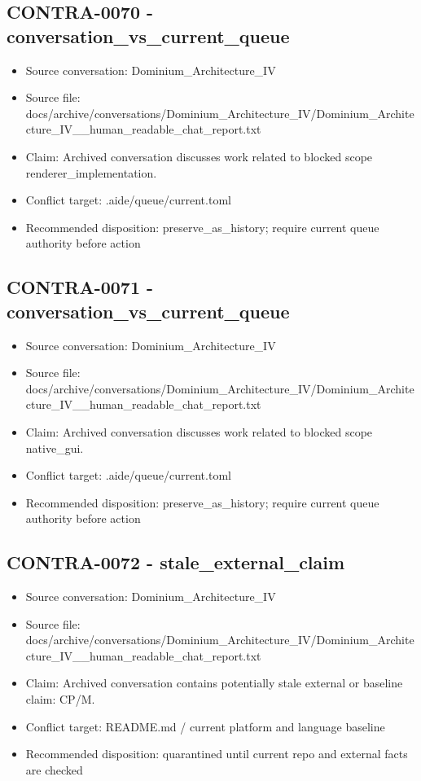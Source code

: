\documentclass[11pt,a4paper]{report}
\begin{document}
\subsection{CONTRA-0070 - conversation\_vs\_current\_queue}

\begin{itemize}
\item Source conversation: Dominium\_Architecture\_IV
\item Source file: docs/archive/conversations/Dominium\_Architecture\_IV/Dominium\_Architecture\_IV\_\_human\_readable\_chat\_report.txt
\item Claim: Archived conversation discusses work related to blocked scope renderer\_implementation.
\item Conflict target: .aide/queue/current.toml
\item Recommended disposition: preserve\_as\_history; require current queue authority before action
\end{itemize}

\subsection{CONTRA-0071 - conversation\_vs\_current\_queue}

\begin{itemize}
\item Source conversation: Dominium\_Architecture\_IV
\item Source file: docs/archive/conversations/Dominium\_Architecture\_IV/Dominium\_Architecture\_IV\_\_human\_readable\_chat\_report.txt
\item Claim: Archived conversation discusses work related to blocked scope native\_gui.
\item Conflict target: .aide/queue/current.toml
\item Recommended disposition: preserve\_as\_history; require current queue authority before action
\end{itemize}

\subsection{CONTRA-0072 - stale\_external\_claim}

\begin{itemize}
\item Source conversation: Dominium\_Architecture\_IV
\item Source file: docs/archive/conversations/Dominium\_Architecture\_IV/Dominium\_Architecture\_IV\_\_human\_readable\_chat\_report.txt
\item Claim: Archived conversation contains potentially stale external or baseline claim: CP/M.
\item Conflict target: README.md / current platform and language baseline
\item Recommended disposition: quarantined until current repo and external facts are checked
\end{itemize}
\end{document}
